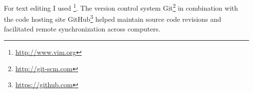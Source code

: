 For text editing I used \footnote{\url{http://www.vim.org}}. The version control system
Git\footnote{\url{http://git-scm.com}} in combination with the code hosting site
GitHub\footnote{\url{https://github.com}} helped maintain source code revisions
and facilitated remote synchronization across computers.
